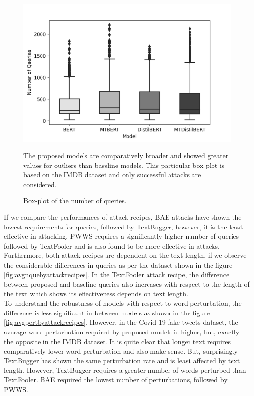 \documentclass[%
	BCOR=8mm, %
	DIV=12,
	toc=bibliography, %
	toc=listof, %
	oneside, %
	egregdoesnotlikesansseriftitles, %
	]{scrbook}
\begin{document}
\begin{figure}[H]
    \centering
    \includegraphics[width=0.55\linewidth]{img/NumQueriesDist_IMDB.png}
    \caption{Box-plot of the number of queries.}{ The proposed models are comparatively broader and showed greater values for outliers than baseline models. This particular box plot is based on the IMDB dataset and only successful attacks are considered.}
    \label{fig:numofqueriesdist}
\end{figure}
If we compare the performances of attack recipes, BAE attacks have shown the lowest requirements for queries, followed by TextBugger, however, it is the least effective in attacking. PWWS requires a significantly higher number of queries followed by TextFooler and is also found to be more effective in attacks. Furthermore, both attack recipes are dependent on the text length, if we observe the considerable differences in queries as per the dataset shown in the figure \ref{fig:avgnquebyattackrecipes}. In the TextFooler attack recipe, the difference between proposed and baseline queries also increases with respect to the length of the text which shows its effectiveness depends on text length. \\
To understand the robustness of models with respect to word perturbation, the difference is less significant in between models as shown in the figure \ref{fig:avgpertbyattackrecipes}. However, in the Covid-19 fake tweets dataset, the average word perturbation required by proposed models is higher, but, exactly the opposite in the IMDB dataset. It is quite clear that longer text requires comparatively lower word perturbation and also make sense. But, surprisingly TextBugger has shown the same perturbation rate and is least affected by text length. However,  TextBugger requires a greater number of words perturbed than TextFooler. BAE required the lowest number of perturbations, followed by PWWS.
\end{document}
